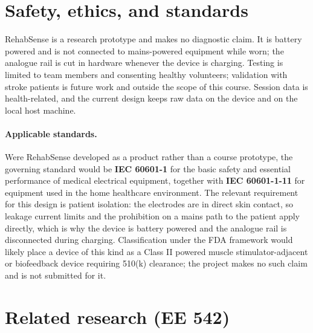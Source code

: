 \documentclass[11pt]{article}
\begin{document}
\section{Safety, ethics, and standards}

RehabSense is a research prototype and makes no diagnostic claim. It is battery
powered and is not connected to mains-powered equipment while worn; the analogue
rail is cut in hardware whenever the device is charging. Testing is limited to
team members and consenting healthy volunteers; validation with stroke patients
is future work and outside the scope of this course. Session data is
health-related, and the current design keeps raw data on the device and on the
local host machine.

\paragraph{Applicable standards.} Were RehabSense developed as a product rather
than a course prototype, the governing standard would be
\textbf{IEC 60601-1} for the basic safety and essential performance of medical
electrical equipment, together with \textbf{IEC 60601-1-11} for equipment used in
the home healthcare environment. The relevant requirement for this design is
patient isolation: the electrodes are in direct skin contact, so leakage current
limits and the prohibition on a mains path to the patient apply directly, which
is why the device is battery powered and the analogue rail is disconnected
during charging. Classification under the FDA framework would likely place a
device of this kind as a Class II powered muscle stimulator-adjacent or
biofeedback device requiring 510(k) clearance; the project makes no such claim
and is not submitted for it.

\appendix
\section{Related research (EE 542)}
\end{document}

